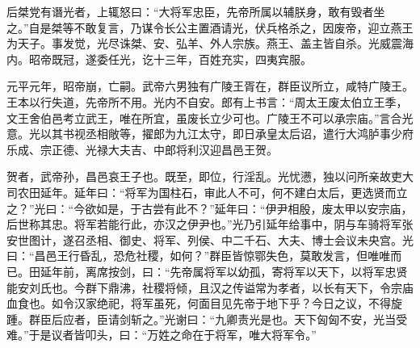 \documentclass[12pt,UTF8]{ctexbook}
\begin{document}
后桀党有谮光者，上辄怒曰：“大将军忠臣，先帝所属以辅朕身，敢有毁者坐之。”自是桀等不敢复言，乃谋令长公主置酒请光，伏兵格杀之，因废帝，迎立燕王为天子。事发觉，光尽诛桀、安、弘羊、外人宗族。燕王、盖主皆自杀。光威震海内。昭帝既冠，遂委任光，讫十三年，百姓充实，四夷宾服。



元平元年，昭帝崩，亡嗣。武帝六男独有广陵王胥在，群臣议所立，咸特广陵王。王本以行失道，先帝所不用。光内不自安。郎有上书言：“周太王废太伯立王季，文王舍伯邑考立武王，唯在所宜，虽废长立少可也。广陵王不可以承宗庙。”言合光意。光以其书视丞相敞等，擢郎为九江太守，即日承皇太后诏，遣行大鸿胪事少府乐成、宗正德、光禄大夫吉、中郎将利汉迎昌邑王贺。



贺者，武帝孙，昌邑哀王子也。既至，即位，行淫乱。光忧懑，独以问所亲故吏大司农田延年。延年曰：“将军为国柱石，审此人不可，何不建白太后，更选贤而立之？”光曰：“今欲如是，于古尝有此不？”延年曰：“伊尹相殷，废太甲以安宗庙，后世称其忠。将军若能行此，亦汉之伊尹也。”光乃引延年给事中，阴与车骑将军张安世图计，遂召丞相、御史、将军、列侯、中二千石、大夫、博士会议未央宫。光曰：“昌邑王行昏乱，恐危社稷，如何？”群臣皆惊鄂失色，莫敢发言，但唯唯而已。田延年前，离席按剑，曰：“先帝属将军以幼孤，寄将军以天下，以将军忠贤能安刘氏也。今群下鼎沸，社稷将倾，且汉之传谥常为孝者，以长有天下，令宗庙血食也。如令汉家绝祀，将军虽死，何面目见先帝于地下乎？今日之议，不得旋踵。群臣后应者，臣请剑斩之。”光谢曰：“九卿责光是也。天下匈匈不安，光当受难。”于是议者皆叩头，曰：“万姓之命在于将军，唯大将军令。”
\end{document}
